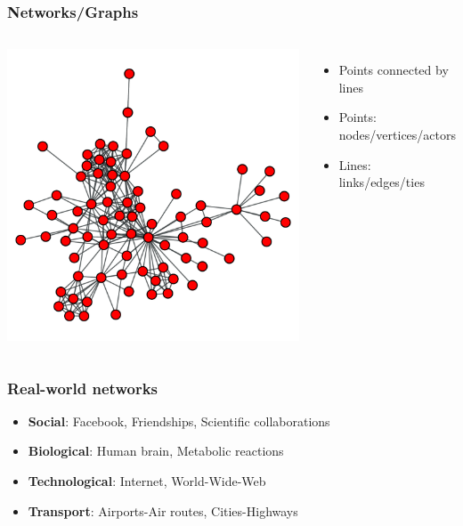 \documentclass{beamer}
\begin{document}
\begin{frame}
    \frametitle{Networks/Graphs}
    \begin{columns}
            \centering
            \includegraphics[width=\columnwidth]{lesmis.pdf}
            \begin{itemize}
                \setlength\itemsep{2em}
                \item{Points connected by lines}
                \item{Points: nodes/vertices/actors}
                \item{Lines: links/edges/ties}
            \end{itemize}
    \end{columns}
\end{frame}
\begin{frame}
    \frametitle{Real-world networks}
    \begin{itemize}
        \setlength\itemsep{1em}
            \item{{\bf Social}: Facebook, Friendships, Scientific collaborations}
            \item{{\bf Biological}: Human brain, Metabolic reactions }
            \item{{\bf Technological}: Internet, World-Wide-Web}
            \item{{\bf Transport}: Airports-Air routes, Cities-Highways}
    \end{itemize}
\end{frame}
\end{document}

